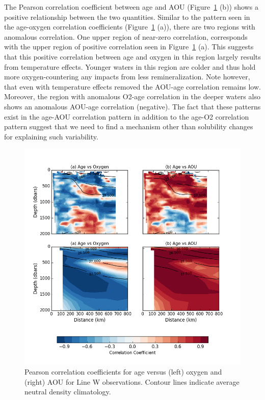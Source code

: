 The Pearson correlation coefficient between age and AOU
(Figure~\ref{fig:correlations} (b)) shows a positive relationship between the
two quantities.  Similar to the pattern seen in the age-oxygen correlation
coefficients (Figure~\ref{fig:correlations} (a)), there are two regions with
anomalous correlation. One upper region of near-zero correlation, corresponds
with the upper region of positive correlation seen in Figure~\ref{fig:correlations}
(a). This suggests that this positive correlation between age and oxygen in this
region largely results from temperature effects. Younger waters in this region
are colder and thus hold more oxygen-countering any impacts from less
remineralization. Note however, that even with temperature effects removed the
AOU-age correlation remains low. Moreover, the region with anomalous O2-age
correlation in the deeper waters also shows an anomalous AOU-age correlation
(negative).  The fact that these patterns exist in the age-AOU correlation pattern
in addition to the age-O2 correlation pattern suggest that we need to find a
mechanism other than solubility changes for explaining such variability.

\begin{figure}
\centering
\includegraphics[width=\linewidth]{correlation.png}
\caption{Pearson correlation coefficients for age versus (left) oxygen and (right) AOU for Line W observations. Contour lines indicate average neutral density climatology.}
\label{fig:correlations}
\end{figure}

